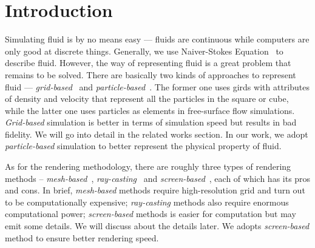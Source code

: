 \documentclass[sigconf]{acmart}
\begin{document}


\maketitle

\section{Introduction}
Simulating fluid is by no means easy --- fluids are continuous while computers are only good at discrete things.
Generally, we use Naiver-Stokes Equation~\cite{navier1838navier} to describe fluid.
However, the way of representing fluid is a great problem that remains to be solved.
There are basically two kinds of approaches to represent fluid --- \textit{grid-based}~\cite{harlow1965numerical, foster2001practical} and \textit{particle-based}~\cite{monaghan1992smoothed, muller2003particle, antoci2007numerical, solenthaler2009predictive, macklin2013position}.
The former one uses girds with attributes of density and velocity that represent all the particles in the square or cube, while the latter one uses particles as elements in free-surface flow simulations.
\textit{Grid-based} simulation is better in terms of simulation speed but results in bad fidelity.
We will go into detail in the related works section.
In our work, we adopt \textit{particle-based} simulation to better represent the physical property of fluid.

As for the rendering methodology, there are roughly three types of rendering methods -- \textit{mesh-based}~\cite{solenthaler2007unified, adams2007adaptively}, \textit{ray-casting}~\cite{fraedrich2010efficient, zirr2015memory} and \textit{screen-based}~\cite{cords2009interactive, bagar2010layered, oliveira2022narrow}, each of which has its pros and cons. In brief, \textit{mesh-based} methods require high-resolution grid and turn out to be computationally expensive; \textit{ray-casting} methods also require enormous computational power; \textit{screen-based} methods is easier for computation but may emit some details. We will discuss about the details later. We adopts \textit{screen-based} method to ensure better rendering speed.
\end{document}
